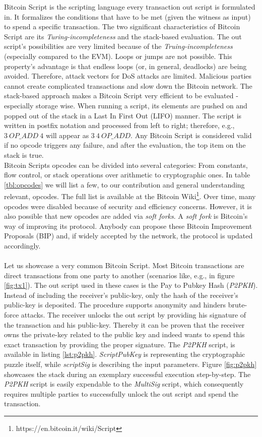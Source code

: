 \documentclass{cacthesis}
\newcounter{protocol}
\begin{document}
        Bitcoin Script is the scripting language every transaction out script is formulated in. It formalizes the conditions that have to be met (given the witness as input) to spend a specific transaction. The two significant characteristics of Bitcoin Script are its \textit{Turing-incompleteness} and the stack-based evaluation. The out script's possibilities are very limited because of the \textit{Truing-incompleteness} (especially compared to the EVM). Loops or jumps are not possible. This property's advantage is that endless loops (or, in general, deadlocks) are being avoided. Therefore, attack vectors for DoS attacks are limited. Malicious parties cannot create complicated transactions and slow down the Bitcoin network. The stack-based approach makes a Bitcoin Script very efficient to be evaluated - especially storage wise. When running a script, its elements are pushed on and popped out of the stack in a Last In First Out (LIFO) manner. The script is written in postfix notation and processed from left to right; therefore, e.g., $3\ OP\_ADD \ 4$ will appear as $3\ 4\ OP\_ADD$. Any Bitcoin Script is considered valid if no opcode triggers any failure, and after the evaluation, the top item on the stack is true. \\
        Bitcoin Scripts opcodes can be divided into several categories: From constants, flow control, or stack operations over arithmetic to cryptographic ones. In table \ref{tbl:opcodes} we will list a few, to our contribution and general understanding relevant, opcodes. The full list is available at the Bitcoin Wiki\footnote{https://en.bitcoin.it/wiki/Script}. Over time, many opcodes were disabled because of security and efficiency concerns. However, it is also possible that new opcodes are added via \textit{soft forks}. A \textit{soft fork} is Bitcoin's way of improving its protocol. Anybody can propose these Bitcoin Improvement Proposals (BIP) and, if widely accepted by the network, the protocol is updated accordingly. \\\\
        Let us showcase a very common Bitcoin Script. Most Bitcoin transactions are direct transactions from one party to another (scenarios like, e.g., in figure \ref{fig:tx1}). The out script used in these cases is the Pay to Pubkey Hash (\textit{P2PKH}). Instead of including the receiver's public-key, only the hash of the receiver's public-key is deposited. The procedure supports anonymity and hinders brute-force attacks. The receiver unlocks the out script by providing his signature of the transaction and his public-key. Thereby it can be proven that the receiver owns the private-key related to the public key and indeed wants to spend this exact transaction by providing the proper signature. The \textit{P2PKH} script, is available in listing \ref{lst:p2pkh}. \textit{ScriptPubKey} is representing the cryptographic puzzle itself, while \textit{scriptSig} is describing the input parameters. Figure \ref{fig:p2pkh} showcases the stack during an exemplary successful execution step-by-step. The \textit{P2PKH} script is easily expendable to the \textit{MultiSig} script, which consequently requires multiple parties to successfully unlock the out script and spend the transaction. \\
        
\end{document}
